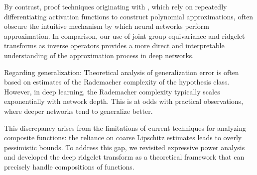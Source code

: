 By contrast, proof techniques originating with \citet{Hornik1989}, which rely on repeatedly differentiating activation functions to construct polynomial approximations, often obscure the intuitive mechanism by which neural networks perform approximation. In comparison, our use of joint group equivariance and ridgelet transforms as inverse operators provides a more direct and interpretable understanding of the approximation process in deep networks.

Regarding generalization: Theoretical analysis of generalization error is often based on estimates of the Rademacher complexity of the hypothesis class. However, in deep learning, the Rademacher complexity typically scales exponentially with network depth. This is at odds with practical observations, where deeper networks tend to generalize better.

This discrepancy arises from the limitations of current techniques for analyzing composite functions: the reliance on coarse Lipschitz estimates leads to overly pessimistic bounds. To address this gap, we revisited expressive power analysis and developed the deep ridgelet transform as a theoretical framework that can precisely handle compositions of functions.




